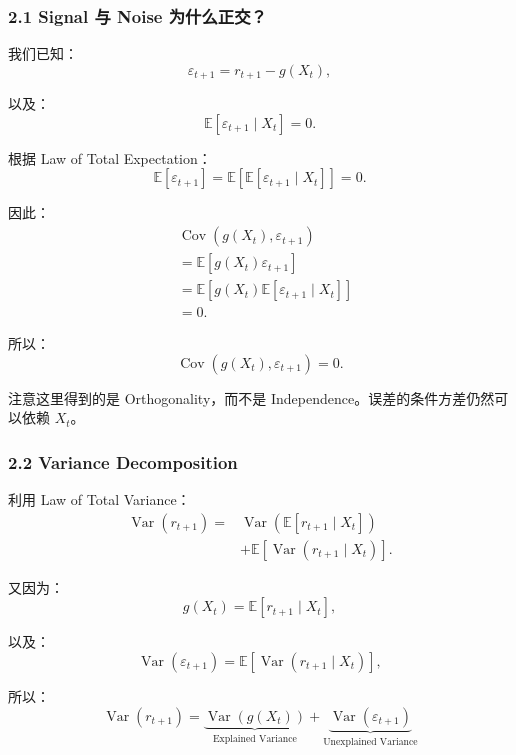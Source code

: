 \hypertarget{part-4-60-0001-signal-ux4e0e-noise-ux4e3aux4ec0ux4e48ux6b63ux4ea4}{%
\subsubsection{2.1 Signal 与 Noise 为什么正交？}\label{part-4-60-0001-signal-ux4e0e-noise-ux4e3aux4ec0ux4e48ux6b63ux4ea4}}

我们已知：
\[\varepsilon_{t+1}
=
r_{t+1}-g(X_t),\]

以及：
\[\mathbb E[\varepsilon_{t+1}\mid X_t]=0.\]

根据 Law of Total Expectation：
\[\mathbb E[\varepsilon_{t+1}]
=
\mathbb E[
\mathbb E[\varepsilon_{t+1}\mid X_t]
]
=0.\]

因此：
\[\begin{aligned}
&\operatorname{Cov}(g(X_t),\varepsilon_{t+1})\\
&=\mathbb E[g(X_t)\varepsilon_{t+1}]\\
&=\mathbb E\left[
g(X_t)\mathbb E[\varepsilon_{t+1}\mid X_t]
\right]\\
&=0.
\end{aligned}\]

所以：
\[\boxed{
\operatorname{Cov}(g(X_t),\varepsilon_{t+1})=0.
}\]

注意这里得到的是 Orthogonality，而不是 Independence。误差的条件方差仍然可以依赖 \(X_t\)。

\hypertarget{part-4-60-0001-variance-decomposition}{%
\subsubsection{2.2 Variance Decomposition}\label{part-4-60-0001-variance-decomposition}}

利用 Law of Total Variance：
\[\begin{aligned}
\operatorname{Var}(r_{t+1})
={}&
\operatorname{Var}\left(
\mathbb E[r_{t+1}\mid X_t]
\right)\\
&+
\mathbb E\left[
\operatorname{Var}(r_{t+1}\mid X_t)
\right].
\end{aligned}\]

又因为：
\[g(X_t)=\mathbb E[r_{t+1}\mid X_t],\]

以及：
\[\operatorname{Var}(\varepsilon_{t+1})
=
\mathbb E[
\operatorname{Var}(r_{t+1}\mid X_t)
],\]

所以：
\[\boxed{
\operatorname{Var}(r_{t+1})
=
\underbrace{
\operatorname{Var}(g(X_t))
}_{\text{Explained Variance}}
+
\underbrace{
\operatorname{Var}(\varepsilon_{t+1})
}_{\text{Unexplained Variance}}
}\]

